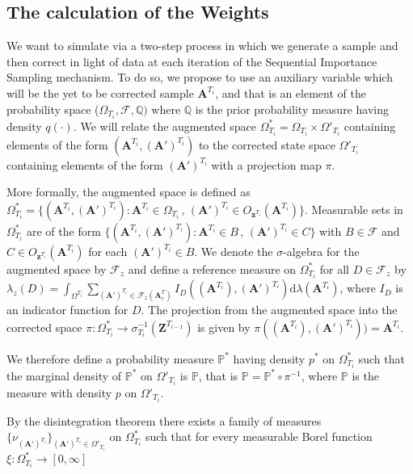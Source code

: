 \documentclass[11pt,a4paper]{article}
\newcommand{\D}{\mathrm{d}}
\renewcommand{\vec}[1]{\mathbf{#1}}
\begin{document}
\subsection{The calculation of the Weights} \label{subsec:weight}

We want to simulate via a two-step process in which we generate a sample and then correct in light of data at each iteration of the Sequential Importance Sampling mechanism. To do so, we propose to use an auxiliary variable which will be the yet to be corrected sample $\vec{A}^{T_i}$, and that is an element of the probability space ($\Omega_{T_i}, \mathcal{F}, \mathbb{Q})$ where $\mathbb{Q}$ is the prior probability measure having density $q(\cdot)$. We will relate the augmented space $\Omega^*_{T_i} = \Omega_{T_i} \times \Omega'_{T_i}$ containing elements of the form $(\vec{A}^{T_i}, (\vec{A}')^{T_i})$ to the corrected state space $\Omega'_{T_i}$ containing elements of the form  $(\vec{A}')^{T_i}$ with a projection map $\pi$. 

More formally, the augmented space is defined as $\Omega^*_{T_i} = \{ (\vec{A}^{T_i}, (\vec{A}')^{T_i}) : \vec{A}^{T_i} \in \Omega_{T_i} \, , \, (\vec{A}')^{T_i} \in O_{\vec{z}^{T_i}} (\vec{A}^{T_i}) \}$. Measurable sets in $\Omega^*_{T_i}$ are of the form $\{ (\vec{A}^{T_i}, (\vec{A}')^{T_i}) : \vec{A}^{T_i} \in B \, , \, (\vec{A}')^{T_i} \in C \}$ with $B \in \mathcal{F}$ and $C \in O_{\vec{z}^{T_i}} (\vec{A}^{T_i})$ for each $(\vec{A}')^{T_i} \in B$. We denote the $\sigma$-algebra for the augmented space by $\mathcal{F}_z$ and define a reference measure on $\Omega^*_{T_i}$ for all $D \in \mathcal{F}_z$ by $\lambda_z(D) = \int_{\Omega^{T_i}} \sum_{(\vec{A}')^{T_i} \in \mathcal{F}_z(\vec{A}^T_i)} I_D((\vec{A}^{T_i}), (\vec{A}')^{T_i}) \D \lambda(\vec{A}^{T_i})$, where $I_D$ is an indicator function for $D$. The projection from the augmented space into the corrected space $\pi : \Omega^*_{T_i} \rightarrow \sigma^{-1}_{T_i}(\vec{Z}^{T_{i-1}})$ is given by $\pi((\vec{A}^{T_i}), (\vec{A}')^{T_i})) = \vec{A}^{T_i}$. 

We therefore define a probability measure $\mathbb{P}^*$ having density $p^*$ on $\Omega^*_{T_i}$ such that the marginal density of $\mathbb{P}^*$ on $\Omega'_{T_i}$ is $\mathbb{P}$, that is $\mathbb{P} = \mathbb{P}^* \circ \pi^{-1}$, where $\mathbb{P}$ is the measure with density $p$ on $\Omega'_{T_i}$.

By the disintegration theorem there exists a family of measures $\{ \nu_{(\vec{A}')^{T_i}}\}_{(\vec{A}')^{T_i} \in \Omega'_{T_i}}$ on $\Omega^*_{T_i}$ such that for every measurable Borel function $ \xi : \Omega^*_{T_i} \rightarrow [0, \infty]$
\end{document}
